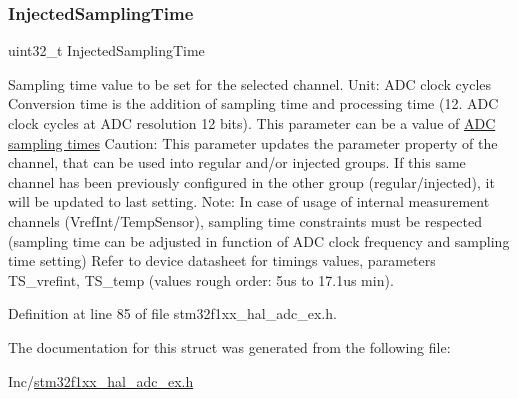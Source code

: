 \subsubsection{\texorpdfstring{Injected\+Sampling\+Time}{InjectedSamplingTime}}
{\footnotesize\ttfamily uint32\+\_\+t Injected\+Sampling\+Time}

Sampling time value to be set for the selected channel. Unit\+: A\+DC clock cycles Conversion time is the addition of sampling time and processing time (12. A\+DC clock cycles at A\+DC resolution 12 bits). This parameter can be a value of \hyperlink{group___a_d_c__sampling__times}{A\+DC sampling times} Caution\+: This parameter updates the parameter property of the channel, that can be used into regular and/or injected groups. If this same channel has been previously configured in the other group (regular/injected), it will be updated to last setting. Note\+: In case of usage of internal measurement channels (Vref\+Int/\+Temp\+Sensor), sampling time constraints must be respected (sampling time can be adjusted in function of A\+DC clock frequency and sampling time setting) Refer to device datasheet for timings values, parameters T\+S\+\_\+vrefint, T\+S\+\_\+temp (values rough order\+: 5us to 17.\+1us min). 

Definition at line 85 of file stm32f1xx\+\_\+hal\+\_\+adc\+\_\+ex.\+h.



The documentation for this struct was generated from the following file\+:\begin{DoxyCompactItemize}
\item 
Inc/\hyperlink{stm32f1xx__hal__adc__ex_8h}{stm32f1xx\+\_\+hal\+\_\+adc\+\_\+ex.\+h}\end{DoxyCompactItemize}
